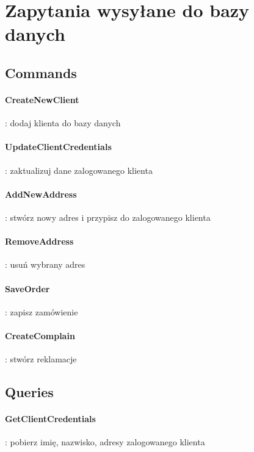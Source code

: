 \documentclass[12pt]{report}
\begin{document}
	\section{Zapytania wysyłane do bazy danych}
	
		\subsection{Commands}
		
				\paragraph{CreateNewClient} : dodaj klienta do bazy danych 
				
				\paragraph{UpdateClientCredentials} : zaktualizuj dane zalogowanego klienta
				
				\paragraph{AddNewAddress} : stwórz nowy adres i przypisz do zalogowanego klienta
				
				\paragraph{RemoveAddress} : usuń wybrany adres
				
				\paragraph{SaveOrder} : zapisz zamówienie
				
				\paragraph{CreateComplain} : stwórz reklamacje
				
		\subsection{Queries}
			
				\paragraph{GetClientCredentials} : pobierz imię, nazwisko, adresy zalogowanego klienta
				
\end{document}
